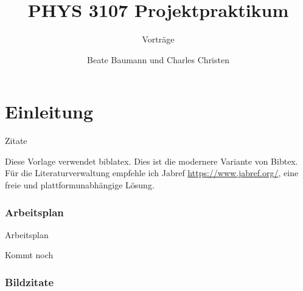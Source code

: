 \documentclass[aspectratio=169]{beamer}
\title{PHYS 3107 Projektpraktikum}
\author{Beate Baumann und Charles Christen}
\institute
{
  BA Physik
}
\subtitle{Vortr\"{a}ge}
\begin{document}
\frame[plain]{\titlepage}


\part{Einleitung}

\begin{frame}{Zitate}{}



    Diese Vorlage verwendet biblatex. Dies ist die modernere Variante von Bibtex. F\"{u}r die Literaturverwaltung empfehle ich Jabref \href{https://www.jabref.org/}{https://www.jabref.org/}, eine freie und plattformunabh\"{a}ngige L\"{o}sung.



\end{frame}

\section{Arbeitsplan}

\begin{frame}{Arbeitsplan}{ }

Kommt noch

\end{frame}

\section{Bildzitate}
\end{document}
